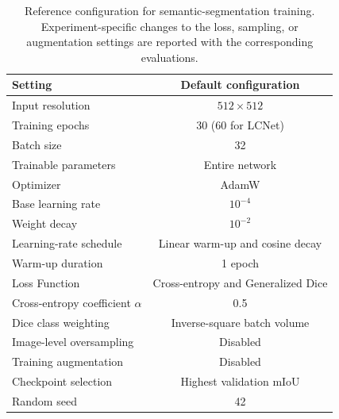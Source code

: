 \begin{table}[ht!]
    \centering
    \begin{tabular}{@{}l c@{}}
        \toprule
        \textbf{Setting}                     & \textbf{Default configuration}     \\
        \midrule
        \midrule
        Input resolution                     & \(512 \times 512\)                 \\
        Training epochs                      & 30 (60 for LCNet)                  \\
        Batch size                           & 32                                 \\
        Trainable parameters                 & Entire network                     \\
        Optimizer                            & AdamW                              \\
        Base learning rate                   & \(10^{-4}\)                        \\
        Weight decay                         & \(10^{-2}\)                        \\
        Learning-rate schedule               & Linear warm-up and cosine decay    \\
        Warm-up duration                     & 1 epoch                            \\
        Loss Function                        & Cross-entropy and Generalized Dice \\
        Cross-entropy coefficient \(\alpha\) & 0.5                                \\
        Dice class weighting                 & Inverse-square batch volume        \\
        Image-level oversampling             & Disabled                           \\
        Training augmentation                & Disabled                           \\
        Checkpoint selection                 & Highest validation mIoU            \\
        Random seed                          & 42                                 \\
        \bottomrule
    \end{tabular}
    \vspace{5mm}
    \caption{Reference configuration for semantic-segmentation training.
        Experiment-specific changes to the loss, sampling, or augmentation
        settings are reported with the corresponding evaluations.}
    \label{tab}
\end{table}

